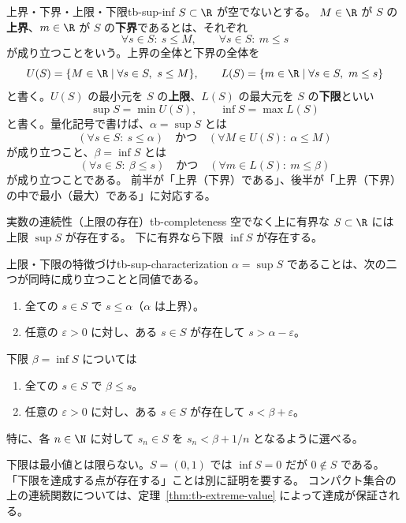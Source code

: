 \begin{definition}{上界・下界・上限・下限}{tb-sup-inf}
$S\subset\R$ が空でないとする。
$M\in\R$ が $S$ の\textbf{上界}、$m\in\R$ が $S$ の\textbf{下界}であるとは、それぞれ
\[
\forall s\in S:\ s\le M,
\qquad
\forall s\in S:\ m\le s
\]
が成り立つことをいう。上界の全体と下界の全体を
\[
U(S)=\{M\in\R\mid\forall s\in S,\ s\le M\},
\qquad
L(S)=\{m\in\R\mid\forall s\in S,\ m\le s\}
\]
と書く。$U(S)$ の最小元を $S$ の\textbf{上限}、$L(S)$ の最大元を $S$ の\textbf{下限}といい
\[
\sup S=\min U(S),
\qquad
\inf S=\max L(S)
\]
と書く。量化記号で書けば、$\alpha=\sup S$ とは
\[
(\forall s\in S:\ s\le\alpha)
\quad\text{かつ}\quad
(\forall M\in U(S):\ \alpha\le M)
\]
が成り立つこと、$\beta=\inf S$ とは
\[
(\forall s\in S:\ \beta\le s)
\quad\text{かつ}\quad
(\forall m\in L(S):\ m\le\beta)
\]
が成り立つことである。
前半が「上界（下界）である」、後半が「上界（下界）の中で最小（最大）である」に対応する。
\end{definition}

\begin{theorem}{実数の連続性（上限の存在）}{tb-completeness}
空でなく上に有界な $S\subset\R$ には上限 $\sup S$ が存在する。
下に有界なら下限 $\inf S$ が存在する。
\end{theorem}

\begin{proposition}{上限・下限の特徴づけ}{tb-sup-characterization}
$\alpha=\sup S$ であることは、次の二つが同時に成り立つことと同値である。
\begin{enumerate}
  \item 全ての $s\in S$ で $s\le\alpha$（$\alpha$ は上界）。
  \item 任意の $\varepsilon>0$ に対し、ある $s\in S$ が存在して $s>\alpha-\varepsilon$。
\end{enumerate}
下限 $\beta=\inf S$ については
\begin{enumerate}
  \item 全ての $s\in S$ で $\beta\le s$。
  \item 任意の $\varepsilon>0$ に対し、ある $s\in S$ が存在して $s<\beta+\varepsilon$。
\end{enumerate}
特に、各 $n\in\N$ に対して $s_n\in S$ を $s_n<\beta+1/n$ となるように選べる。
\end{proposition}

下限は最小値とは限らない。$S=(0,1)$ では $\inf S=0$ だが $0\notin S$ である。
「下限を達成する点が存在する」ことは別に証明を要する。
コンパクト集合の上の連続関数については、定理~\ref{thm:tb-extreme-value} によって達成が保証される。

